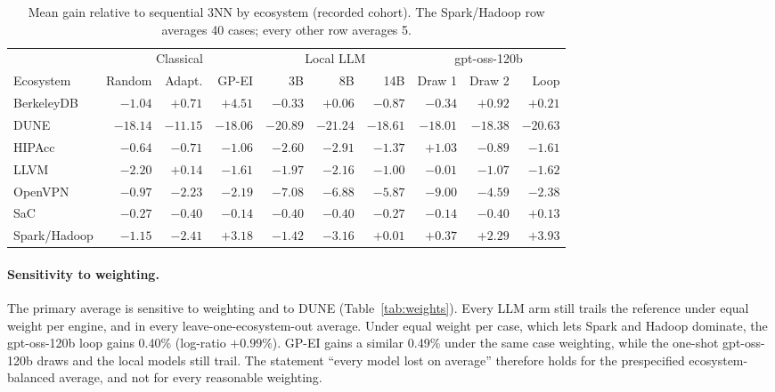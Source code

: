 \begin{table}[t]
\centering
\caption{Mean gain relative to sequential 3NN by ecosystem (recorded cohort). The Spark/Hadoop row averages 40 cases; every other row averages 5.}
\label{tab:eco}
\small
\setlength{\tabcolsep}{4pt}
\begin{tabular}{lrrrrrrrrr}
\toprule
 & \multicolumn{3}{c}{Classical} & \multicolumn{3}{c}{Local LLM} & \multicolumn{3}{c}{gpt-oss-120b} \\
\cmidrule(lr){2-4}\cmidrule(lr){5-7}\cmidrule(lr){8-10}
Ecosystem & Random & Adapt. & GP-EI & 3B & 8B & 14B & Draw 1 & Draw 2 & Loop \\
\midrule
BerkeleyDB & $-1.04$ & $+0.71$ & $+4.51$ & $-0.33$ & $+0.06$ & $-0.87$ & $-0.34$ & $+0.92$ & $+0.21$ \\
DUNE & $-18.14$ & $-11.15$ & $-18.06$ & $-20.89$ & $-21.24$ & $-18.61$ & $-18.01$ & $-18.38$ & $-20.63$ \\
HIPAcc & $-0.64$ & $-0.71$ & $-1.06$ & $-2.60$ & $-2.91$ & $-1.37$ & $+1.03$ & $-0.89$ & $-1.61$ \\
LLVM & $-2.20$ & $+0.14$ & $-1.61$ & $-1.97$ & $-2.16$ & $-1.00$ & $-0.01$ & $-1.07$ & $-1.62$ \\
OpenVPN & $-0.97$ & $-2.23$ & $-2.19$ & $-7.08$ & $-6.88$ & $-5.87$ & $-9.00$ & $-4.59$ & $-2.38$ \\
SaC & $-0.27$ & $-0.40$ & $-0.14$ & $-0.40$ & $-0.40$ & $-0.27$ & $-0.14$ & $-0.40$ & $+0.13$ \\
Spark/Hadoop & $-1.15$ & $-2.41$ & $+3.18$ & $-1.42$ & $-3.16$ & $+0.01$ & $+0.37$ & $+2.29$ & $+3.93$ \\
\bottomrule
\end{tabular}
\end{table}

\paragraph{Sensitivity to weighting.} The primary average is sensitive to weighting and to DUNE (Table~\ref{tab:weights}). Every LLM arm still trails the reference under equal weight per engine, and in every leave-one-ecosystem-out average. Under equal weight per case, which lets Spark and Hadoop dominate, the gpt-oss-120b loop gains 0.40\% (log-ratio $+0.99\%$). GP-EI gains a similar 0.49\% under the same case weighting, while the one-shot gpt-oss-120b draws and the local models still trail. The statement ``every model lost on average'' therefore holds for the prespecified ecosystem-balanced average, and not for every reasonable weighting.

